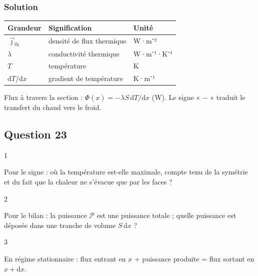 \documentclass[11pt,a4paper]{article}
\newcommand{\equationajustee}[1]{%
  \sbox{\boiteequation}{$\displaystyle #1$}%
  \ifdim\wd\boiteequation>\linewidth
    \[\resizebox{\linewidth}{!}{\usebox{\boiteequation}}\]%
  \else
    \[#1\]%
  \fi}
\begin{document}
\hypertarget{solution-21}{%
\subsubsection{Solution}\label{solution-21}}

\equationajustee{\boxed{\vec\jmath_{\mathrm{th}}=-\lambda\frac{\mathrm dT}{\mathrm dx}\vec e_x}}

\begin{longtable}[]{@{}lll@{}}
\toprule\noalign{}
Grandeur & Signification & Unité \\
\midrule\noalign{}
\endhead
\bottomrule\noalign{}
\endlastfoot
\(\vec\jmath_{\mathrm{th}}\) & densité de flux thermique & W·m⁻² \\
\(\lambda\) & conductivité thermique & W·m⁻¹·K⁻¹ \\
\(T\) & température & K \\
\(\mathrm dT/\mathrm dx\) & gradient de température & K·m⁻¹ \\
\end{longtable}

Flux à travers la section : \(\Phi(x)=-\lambda S\,\mathrm dT/\mathrm dx\) (W). Le signe « \(-\) » traduit le transfert du chaud vers le froid.

\hypertarget{question-23}{%
\subsection{Question 23}\label{question-23}}

\begin{indication}{1}

Pour le signe : où la température est-elle maximale, compte tenu de la symétrie et du fait que la chaleur ne s'évacue que par les faces ?

\end{indication}

\begin{indication}{2}

Pour le bilan : la puissance \(\mathcal P\) est une puissance totale ; quelle puissance est déposée dans une tranche de volume \(S\,\mathrm dx\) ?

\end{indication}

\begin{indication}{3}

En régime stationnaire : flux entrant en \(x\) + puissance produite = flux sortant en \(x+\mathrm dx\).

\end{indication}
\end{document}
